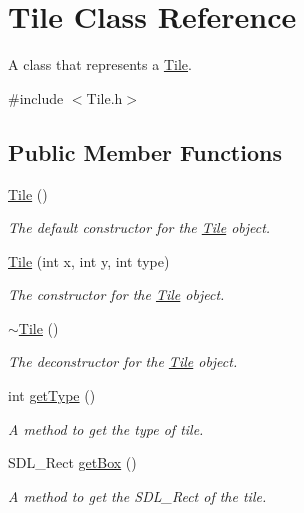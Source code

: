 \hypertarget{class_tile}{\section{Tile Class Reference}
\label{class_tile}
}


A class that represents a \hyperlink{class_tile}{Tile}.  




{\ttfamily \#include $<$Tile.\+h$>$}

\subsection*{Public Member Functions}
\begin{DoxyCompactItemize}
\item 
\hypertarget{class_tile_aeeb5593bb6b75aae2edfcccbc84ab378}{\hyperlink{class_tile_aeeb5593bb6b75aae2edfcccbc84ab378}{Tile} ()}\label{class_tile_aeeb5593bb6b75aae2edfcccbc84ab378}

\begin{DoxyCompactList}\small\item\em The default constructor for the \hyperlink{class_tile}{Tile} object. \end{DoxyCompactList}\item 
\hyperlink{class_tile_af825c40b67f4d0544c29f294363919a8}{Tile} (int x, int y, int type)
\begin{DoxyCompactList}\small\item\em The constructor for the \hyperlink{class_tile}{Tile} object. \end{DoxyCompactList}\item 
\hypertarget{class_tile_a98634abbd93fa13d0578d7103202d03d}{\hyperlink{class_tile_a98634abbd93fa13d0578d7103202d03d}{$\sim$\+Tile} ()}\label{class_tile_a98634abbd93fa13d0578d7103202d03d}

\begin{DoxyCompactList}\small\item\em The deconstructor for the \hyperlink{class_tile}{Tile} object. \end{DoxyCompactList}\item 
int \hyperlink{class_tile_a8582d28ecc7a974dd6d5263d73b8f1f1}{get\+Type} ()
\begin{DoxyCompactList}\small\item\em A method to get the type of tile. \end{DoxyCompactList}\item 
S\+D\+L\+\_\+\+Rect \hyperlink{class_tile_a80c85e60ea0a0dc196fb5ebed132e386}{get\+Box} ()
\begin{DoxyCompactList}\small\item\em A method to get the S\+D\+L\+\_\+\+Rect of the tile. \end{DoxyCompactList}\end{DoxyCompactItemize}


